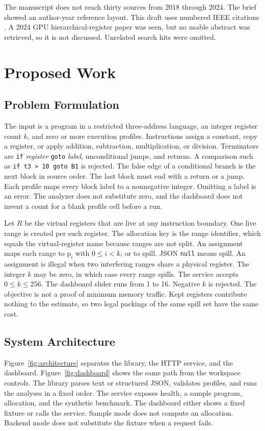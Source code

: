 \documentclass{ieeeaccess}
\begin{document}
The manuscript does not reach thirty sources from 2018 through 2024.
The brief showed an author-year reference layout.
This draft uses numbered IEEE citations \cite{ieeeaccess-authors}.
A 2024 GPU hierarchical-register paper was seen, but no usable abstract was retrieved, so it is not discussed.
Unrelated search hits were omitted.

\section{Proposed Work}
\label{sec:proposed}

\subsection{Problem Formulation}
\label{sec:formulation}
The input is a program in a restricted three-address language, an integer register count $k$, and zero or more execution profiles.
Instructions assign a constant, copy a register, or apply addition, subtraction, multiplication, or division.
Terminators are \texttt{if} \emph{register} \texttt{goto} \emph{label}, unconditional jumps, and returns.
A comparison such as \texttt{if t3 > 10 goto B1} is rejected.
The false edge of a conditional branch is the next block in source order.
The last block must end with a return or a jump.
Each profile maps every block label to a nonnegative integer.
Omitting a label is an error.
The analyzer does not substitute zero, and the dashboard does not invent a count for a blank profile cell before a run.

Let $R$ be the virtual registers that are live at any instruction boundary.
One live range is created per such register.
The allocation key is the range identifier, which equals the virtual-register name because ranges are not split.
An assignment maps each range to $\mathrm{p}_i$ with $0 \leq i < k$, or to spill.
JSON \texttt{null} means spill.
An assignment is illegal when two interfering ranges share a physical register.
The integer $k$ may be zero, in which case every range spills.
The service accepts $0 \leq k \leq 256$.
The dashboard slider runs from 1 to 16.
Negative $k$ is rejected.
The objective is not a proof of minimum memory traffic.
Kept registers contribute nothing to the estimate, so two legal packings of the same spill set have the same cost.

\subsection{System Architecture}
\label{sec:architecture}
Figure~\ref{fig:architecture} separates the library, the HTTP service, and the dashboard.
Figure~\ref{fig:dashboard} shows the same path from the workspace controls.
The library parses text or structured JSON, validates profiles, and runs the analyses in a fixed order.
The service exposes health, a sample program, allocation, and the synthetic benchmark.
The dashboard either shows a fixed fixture or calls the service.
Sample mode does not compute an allocation.
Backend mode does not substitute the fixture when a request fails.
\end{document}
